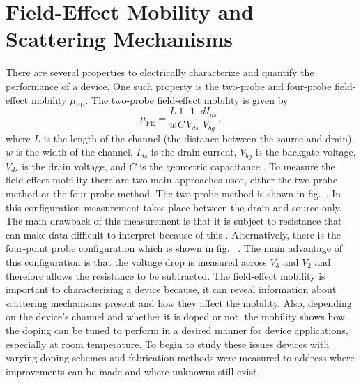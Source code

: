 \section{Field-Effect Mobility and Scattering Mechanisms}\label{sec:mufe_scatter}
There are several properties to electrically characterize and quantify the performance of a device. One such property is the two-probe and four-probe field-effect mobility $\mu_\mathrm{FE}$. The two-probe field-effect mobility is given by 
\begin{equation}\label{eq:mu_fe2}
	\mu_\mathrm{FE} = \frac{L}{w}\frac{1}{C}\frac{1}{V_{ds}}\frac{d I_{ds}}{V_{bg}},
\end{equation}
where $L$ is the length of the channel (the distance between the source and drain), $w$ is the width of the channel, $I_{ds}$ is the drain current, $V_{bg}$ is the backgate voltage, $V_{ds}$ is the drain voltage, and $C$ is the geometric capacitance \cite{Stassen_AppPhysLett2004}. To measure the field-effect mobility there are two main approaches used, either the two-probe method or the four-probe method. The two-probe method is shown in fig.~. In this configuration measurement takes place between the drain and source only. The main drawback of this measurement is that it is subject to resistance that can make data difficult to interpret because of this \cite{Schroder_Semiconductor2006}. Alternatively, there is the four-point probe configuration which is shown in fig.~ \cite{Valdes_IRE1954}. The main advantage of this configuration is that the voltage drop is measured across $V_3$ and $V_2$ and therefore allows the resistance to be subtracted. The field-effect mobility is important to characterizing a device because, it can reveal information about scattering mechanisms present and how they affect the mobility. Also, depending on the device's channel and whether it is doped or not, the mobility shows how the doping can be tuned to perform in a desired manner for device applications, especially at room temperature. To begin to study these issues devices with varying doping schemes and fabrication methods were measured to address where improvements can be made and where unknowns still exist.
